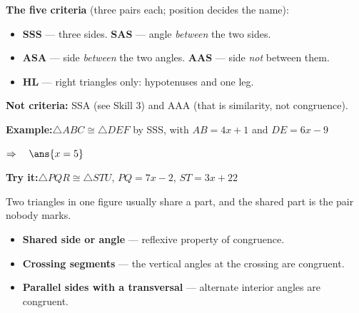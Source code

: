 \documentclass[12pt]{article}
\begin{document}


\begin{formulabox}
\textbf{The five criteria} (three pairs each; position decides the name):
\begin{itemize}[leftmargin=1cm, itemsep=0pt, topsep=2pt]
  \item \textbf{SSS} --- three sides. \quad \textbf{SAS} --- angle \emph{between} the two sides.
  \item \textbf{ASA} --- side \emph{between} the two angles. \quad \textbf{AAS} --- side \emph{not} between them.
  \item \textbf{HL} --- right triangles only: hypotenuses and one leg.
\end{itemize}
\textbf{Not criteria:} SSA (see Skill 3) and AAA (that is similarity, not congruence).
\end{formulabox}

\begin{examplebox}
\textbf{Example:}\quad $\triangle ABC \cong \triangle DEF$ by SSS, with $AB = 4x + 1$ and $DE = 6x - 9$

$\Rightarrow\quad \ans{x = 5}$

\end{examplebox}

\begin{tryitbox}
\textbf{Try it:}\quad $\triangle PQR \cong \triangle STU$, $PQ = 7x - 2$, $ST = 3x + 22$\\[2pt]
\end{tryitbox}


\begin{formulabox}
Two triangles in one figure usually share a part, and the shared part is the pair
nobody marks.
\begin{itemize}[leftmargin=1cm, itemsep=0pt, topsep=2pt]
  \item \textbf{Shared side or angle} --- reflexive property of congruence.
  \item \textbf{Crossing segments} --- the vertical angles at the crossing are congruent.
  \item \textbf{Parallel sides with a transversal} --- alternate interior angles are congruent.
\end{itemize}
\end{formulabox}
\end{document}
